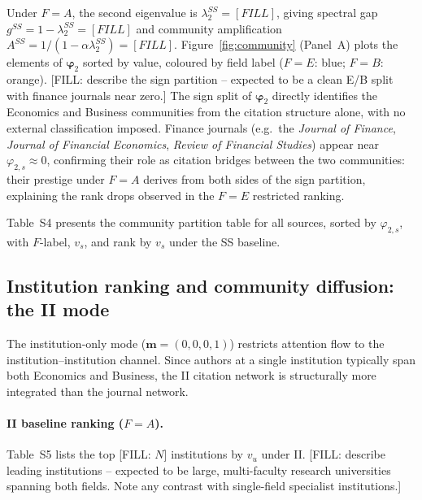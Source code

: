 Under $F=A$, the second eigenvalue is $\lambda_2^{SS}=[FILL]$,
giving spectral gap $g^{SS}=1-\lambda_2^{SS}=[FILL]$ and community
amplification $A^{SS}=1/(1-\alpha\lambda_2^{SS})=[FILL]$.
Figure~\ref{fig:community} (Panel~A) plots the elements of
$\boldsymbol{\varphi}_2$ sorted by value, coloured by field label
($F=E$: blue; $F=B$: orange).
[FILL: describe the sign partition -- expected to be a clean E/B split
with finance journals near zero.]
The sign split of $\boldsymbol{\varphi}_2$ directly identifies the
Economics and Business communities from the citation structure alone,
with no external classification imposed.
Finance journals (e.g.\ the \textit{Journal of Finance},
\textit{Journal of Financial Economics}, \textit{Review of Financial Studies})
appear near $\varphi_{2,s}\approx 0$, confirming their role as citation
bridges between the two communities: their prestige under $F=A$ derives
from both sides of the sign partition, explaining the rank drops observed
in the $F=E$ restricted ranking.

Table~S4 presents the community partition table for all sources, sorted
by $\varphi_{2,s}$, with $F$-label, $v_s$, and rank by $v_s$ under
the SS baseline.

\subsection{Institution ranking and community diffusion: the II mode}
\label{sec:results_ii}

The institution-only mode ($\mathbf{m}=(0,0,0,1)$) restricts attention
flow to the institution--institution channel.
Since authors at a single institution typically span both Economics and
Business, the II citation network is structurally more integrated than
the journal network.

\paragraph{II baseline ranking ($F=A$).}
Table~S5 lists the top [FILL: $N$] institutions by $v_u$ under II.
[FILL: describe leading institutions -- expected to be large, multi-faculty
research universities spanning both fields. Note any contrast with
single-field specialist institutions.]

